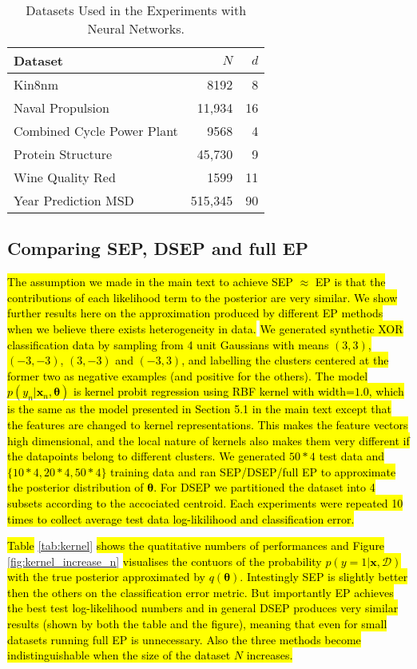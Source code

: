 \documentclass{article} %
\begin{document}
\begin{table} 
\caption{Datasets Used in the Experiments with Neural Networks.}\label{tab:datasets_neural_networks} 
\centering 
\begin{tabular}{lrr} 
\hline  
\textbf{Dataset} & $N$ & $d$ \tabularnewline 
\hline 
Kin8nm & 8192 & 8 \tabularnewline 
Naval Propulsion & 11,934 & 16 \tabularnewline 
Combined Cycle Power Plant & 9568 & 4 \tabularnewline 
Protein Structure & 45,730 & 9 \tabularnewline 
Wine Quality Red & 1599 & 11 \tabularnewline 
Year Prediction MSD & 515,345 & 90 \tabularnewline 
\hline 
\end{tabular}
\end{table}

\subsection{Comparing SEP, DSEP and full EP}
\hl{The assumption we made in the main text to achieve SEP $\approx$ EP is that the contributions of each likelihood term to the posterior are very similar. We show further results here on the approximation produced by different EP methods when we believe there exists heterogeneity in data.}
%
\hl{We generated synthetic XOR classification data by sampling from 4 unit Gaussians with means $(3, 3)$, $(-3, -3)$, $(3, -3)$ and $(-3, 3)$, and labelling the clusters centered at the former two as negative examples (and positive for the others). The model $p(y_n|\bm{x}_n, \bm{\theta})$ is kernel probit regression using RBF kernel with width=$1.0$, which is the same as the model presented in Section 5.1 in the main text except that the features are changed to kernel representations. This makes the feature vectors high dimensional, and the local nature of kernels also makes them very different if the datapoints belong to different clusters. We generated $50*4$ test data and $\{10*4, 20*4, 50*4\}$ training data and ran SEP/DSEP/full EP to approximate the posterior distribution of $\bm{\theta}$. For DSEP we partitioned the dataset into 4 subsets according to the accociated centroid. Each experiments were repeated 10 times to collect average test data log-likilihood and classification error.}

\hl{Table} \ref{tab:kernel} \hl{shows the quatitative numbers of performances and Figure} \ref{fig:kernel_increase_n} \hl{visualises the contuors of the probability $p(y = 1|\bm{x}, \mathcal{D})$ with the true posterior approximated by $q(\bm{\theta})$. Intestingly SEP is slightly better then the others on the classification error metric. But importantly EP achieves the best test log-likelihood numbers and in general DSEP produces very similar results (shown by both the table and the figure), meaning that even for small datasets running full EP is unnecessary. Also the three methods become indistinguishable when the size of the dataset $N$ increases.}
\end{document}
